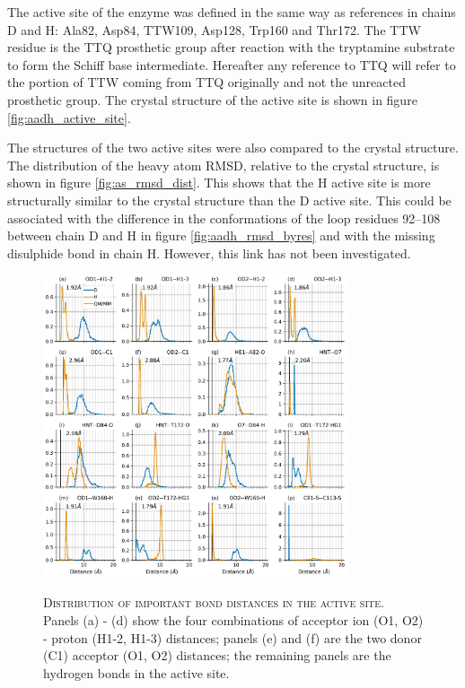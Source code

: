 The active site of the enzyme was defined in the same way as references  \cite{ranaghanInitioQMMM2017, masgrauAtomicDescriptionEnzyme2006, masgrauTunnelingClassicalPaths2007} in chains D and H: Ala82, Asp84, TTW109, Asp128, Trp160 and Thr172. The TTW residue is the TTQ prosthetic group after reaction with the tryptamine substrate to form the Schiff base intermediate. Hereafter any reference to TTQ will refer to the portion of TTW coming from TTQ originally and not the unreacted prosthetic group. The crystal structure of the active site is shown in figure \ref{fig:aadh_active_site}. 

The structures of the two active sites were also compared to the crystal structure. The distribution of the heavy atom RMSD, relative to the crystal structure, is shown in figure \ref{fig:as_rmsd_dist}. This shows that the H active site is more structurally similar to the crystal structure than the D active site. This could be associated with the difference in the conformations of the loop residues \numrange[range-phrase=\text{--}]{92}{108} between chain D and H in figure \ref{fig:aadh_rmsd_byres} and with the missing disulphide bond in chain H. However, this link has not been investigated. 

\begin{figure}
    \centering
    \caption[Distribution of important bond distances in the active site]{\textsc{Distribution of important bond distances in the active site}. Panels (a) - (d) show the four combinations of acceptor ion (O1, O2) - proton (H1-2, H1-3) distances; panels (e) and (f) are the two donor (C1) acceptor (O1, O2) distances; the remaining panels are the hydrogen bonds in the active site.}
    \includegraphics[width=0.8\textwidth]{chapters/aadh/figures/bond_distances_dist.pdf}
    \label{fig:bond_dist}
\end{figure}

